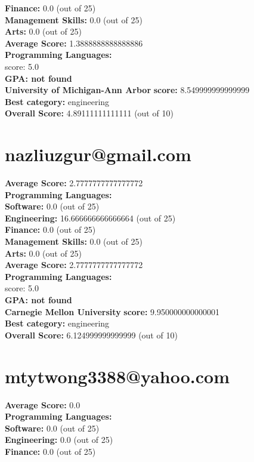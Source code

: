 \documentclass{article}
\begin{document}
    \textbf{Finance:} 0.0 (out of 25)\\
    \textbf{Management Skills:} 0.0 (out of 25)\\
    \textbf{Arts:} 0.0 (out of 25)\\
\textbf{Average Score: } 1.3888888888888886\\
\textbf{Programming Languages:} \\
score: 5.0\\
\textbf{GPA: not found}\\
\textbf{University of Michigan-Ann Arbor} \textbf{score:} 8.549999999999999\\
\textbf{Best category: } engineering\\
    \textbf{Overall Score: }4.89111111111111 (out of 10)\section{nazliuzgur@gmail.com}
\textbf{Average Score: } 2.7777777777777772\\
\textbf{Programming Languages:} \\
\textbf{Software:} 0.0 (out of 25)\\
    \textbf{Engineering: } 16.666666666666664 (out of 25)\\
    \textbf{Finance:} 0.0 (out of 25)\\
    \textbf{Management Skills:} 0.0 (out of 25)\\
    \textbf{Arts:} 0.0 (out of 25)\\
\textbf{Average Score: } 2.7777777777777772\\
\textbf{Programming Languages:} \\
score: 5.0\\
\textbf{GPA: not found}\\
\textbf{Carnegie Mellon University} \textbf{score:} 9.950000000000001\\
\textbf{Best category: } engineering\\
    \textbf{Overall Score: }6.124999999999999 (out of 10)\section{mtytwong3388@yahoo.com}
\textbf{Average Score: } 0.0\\
\textbf{Programming Languages:} \\
\textbf{Software:} 0.0 (out of 25)\\
    \textbf{Engineering: } 0.0 (out of 25)\\
    \textbf{Finance:} 0.0 (out of 25)\\
\end{document}
